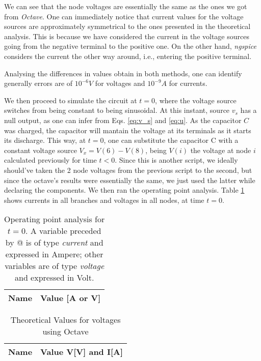 \par We can see that the node voltages are essentially the same as the ones we got from \textit{Octave}. One can immediately notice that current values for the voltage sources are approximately symmetrical to the ones presented in the theoretical analysis. This is because we have considered the current in the voltage sources going from the negative terminal to the positive one. On the other hand, \emph{ngspice} considers the current the other way around, i.e., entering the positive terminal. 

\par Analysing the differences in values obtain in both methods, one can identify generally errors are of $10^{-6} V$ for voltages and $10^{-9} A$ for currents.

\par We then proceed to simulate the circuit at $t=0$, where the voltage source switches from being constant to being sinusoidal. At this instant, source $v_s$ has a null output, as one can infer from Eqs. \ref{eq:v_s} and \ref{eq:u}. As the capacitor $C$ was charged, the capacitor will mantain the voltage at its terminals as it starts its discharge. This way, at $t=0$, one can substitute the capacitor C with a constant voltage source $V_x = V(6)-V(8)$, being $V(i)$ the voltage at node $i$ calculated previously for time $t<0$. Since this is another script, we ideally should've taken the 2 node voltages from the previous script to the second, but since the octave's results were essentially the same, we just used the latter while declaring the components. We then ran the operating point analysis. Table \ref{tab:ngspice_2} shows currents in all branches and voltages in all nodes, at time $t=0$.
\pagebreak
\begin{multicols}{2}
\begin{table}[H]
  \centering
  \begin{tabular}{|l|r|}
    \hline
    {\bf Name} & {\bf Value [A or V]} \\ \hline
    
  \end{tabular}
  \caption{Operating point analysis for $t=0$. A variable preceded by @ is of type {\em current}
    and expressed in Ampere; other variables are of type {\it voltage} and expressed in
    Volt.}
  \label{tab:ngspice_2}
\end{table}

\begin{table}[H]
  \centering
  \begin{tabular}{|l|r|}
    \hline
    {\bf Name} & {\bf Value V[V] and I[A]} \\ \hline
    
  \end{tabular}
  \caption{Theoretical Values for voltages using Octave}
  \label{tab:alinea2_voltagens_tab_2}
\end{table}
\end{multicols}

